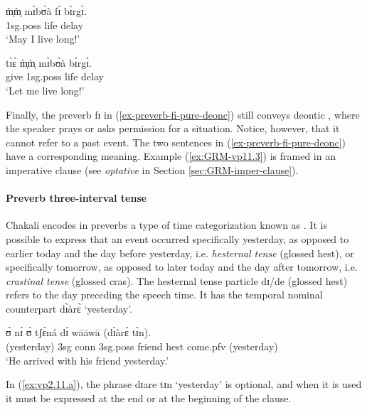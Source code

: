 \begin{exe}
\begin{exe}
\begin{exe}
\begin{exe}
\begin{exe}
\begin{exe}
\begin{exe}
\begin{exe}
\begin{exe}
\begin{exe}
\begin{exe}
\begin{exe}
\ea\label{ex-preverb-fi-pure-deonc}

\ea\label{ex:GRM-vp11.2}
\gll m̩̀m̩̀ mɪ̀bʊ̀à fɪ́  bɪ̀rgɪ̀.\\
 {\sc 1sg.poss} life {\mod}  delay\\
\glt  `May I live long!' 

\ex\label{ex:GRM-vp11.3}
\gll tɪ̀ɛ̀ m̩̀m̩̀ mɪ̀bʊ̀à bɪ́rgɪ̀.\\
   give {\sc 1sg.poss} life delay\\
\glt  `Let me live long!' 

\z 
 \z 


Finally, the preverb {\sls fɪ}  in (\ref{ex-preverb-fi-pure-deonc}) still conveys deontic , where the speaker prays or asks permission for a situation. Notice, however,  that it cannot refer to a past event. The two sentences in (\ref{ex-preverb-fi-pure-deonc}) have a corresponding meaning. Example (\ref{ex:GRM-vp11.3}) is framed in an imperative clause (see  {\it optative} in Section \ref{sec:GRM-imper-clause}). 


\paragraph{Preverb three-interval tense}
\label{sec:GRM-preverb-three-int-tense}

Chakali encodes  in  preverbs  a type of time categorization  known as   \citep[366]{Fraw92}.   It is possible to express that an event occurred specifically yesterday, as opposed to earlier today and the day before yesterday, i.e. {\it hesternal tense} (glossed {\sc hest}), or specifically tomorrow, as opposed to later today and the day after tomorrow, i.e. {\it crastinal tense}  (glossed  {\sc cras}). The hesternal tense particle {\sls dɪ}/{\sls de} (glossed {\sc hest})  refers to the day preceding the speech time.  It has the temporal nominal  counterpart  {\sls dɪ̀àrɛ̀} `yesterday'.  

\ea\label{ex:vp2.11.a} 
 ʊ̀ nɪ́ ʊ̀ tʃɛ̀ná dɪ́ wāāwā  {(dɪ̀àrɛ̀ tɪ̀n)}.\\
{(yesterday)} {\sc 3sg} {\sc conn} {\sc 3sg.poss} friend
{\sc hest}  come.{\sc pfv} {(yesterday)}\\
\glt  `He arrived with his friend yesterday.'
 \z



In (\ref{ex:vp2.11.a}),  the  phrase {\sls dɪare 
tɪn} `yesterday' is optional,  and  when it is used it must be expressed at the 
end or at the beginning of the clause.



\end{exe}
\end{exe}
\end{exe}
\end{exe}
\end{exe}
\end{exe}
\end{exe}
\end{exe}
\end{exe}
\end{exe}
\end{exe}
\end{exe}

